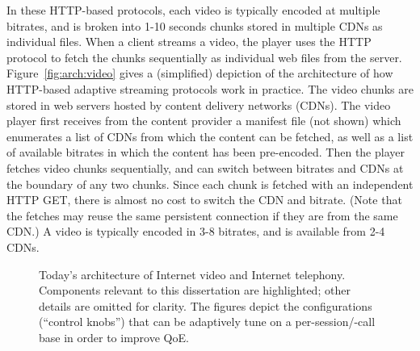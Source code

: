 In these HTTP-based protocols, each video is typically encoded at multiple 
bitrates, and is broken into 1-10 seconds chunks stored in multiple CDNs as individual files.
When a client streams a video, the player uses the HTTP protocol to fetch the chunks 
sequentially as individual web files from the server. 
Figure~\ref{fig:arch:video} gives a (simplified) depiction of the architecture
of how HTTP-based adaptive streaming protocols work in practice. 
The video chunks are stored in web servers hosted by content delivery networks
(CDNs). The video player first receives from the content provider a manifest file 
(not shown) which enumerates a list of CDNs from which the content can be 
fetched, as well as a list of available bitrates in which the content has been pre-encoded.
Then the player fetches video chunks sequentially, and 
can switch between bitrates and CDNs at the boundary of 
any two chunks. Since each chunk is fetched with an independent HTTP GET, 
there is almost no cost to switch the CDN and bitrate.
(Note that the fetches may reuse the same persistent connection 
if they are from the same CDN.)
A video is typically encoded in 3-8 bitrates, and is available from 
2-4 CDNs.


\begin{figure}[t]
\centering
\captionsetup[subfigure]{justification=centering,farskip=-1pt,captionskip=5pt}
\caption{Today's architecture of Internet video and Internet telephony. 
Components relevant to this dissertation are highlighted; other details 
are omitted for clarity. 
The figures depict the configurations (``control knobs'')
that can be adaptively tune on a per-session/-call base in order to improve
QoE.}
\label{fig:app-arch}
\end{figure}



